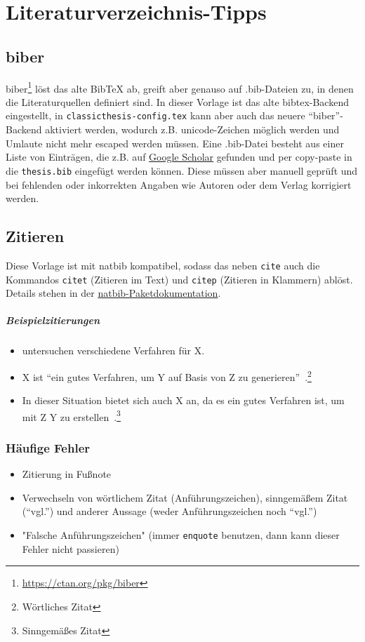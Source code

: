 \chapter{Literaturverzeichnis-Tipps}

\section{biber}
biber\footnote{\url{https://ctan.org/pkg/biber}} löst das alte BibTeX ab, greift aber genauso auf .bib-Dateien zu, in denen die Literaturquellen definiert sind. In dieser Vorlage ist das alte bibtex-Backend eingestellt, in \texttt{classicthesis-config.tex} kann aber auch das neuere \enquote{biber}-Backend aktiviert werden, wodurch z.B. unicode-Zeichen möglich werden und Umlaute nicht mehr escaped werden müssen.
Eine .bib-Datei besteht aus einer Liste von Einträgen, die z.B. auf \href{https://scholar.google.com}{Google Scholar} gefunden und per copy-paste in die \texttt{thesis.bib} eingefügt werden können.
Diese müssen aber manuell geprüft und bei fehlenden oder inkorrekten Angaben wie Autoren oder dem Verlag korrigiert werden.

\section{Zitieren}
Diese Vorlage ist mit natbib kompatibel, sodass das neben \texttt{cite} auch die Kommandos \texttt{citet} (Zitieren im Text) und \texttt{citep} (Zitieren in Klammern) ablöst.
Details stehen in der \href{http://mirrors.ctan.org/macros/latex/contrib/natbib/natbib.pdf}{natbib-Paketdokumentation}.

\paragraph{Beispielzitierungen}
\begin{itemize}
\item \citet{sniktec} untersuchen verschiedene Verfahren für X.
\item X ist \enquote{ein gutes Verfahren, um Y auf Basis von Z zu generieren}~\citep{sniktec}.\footnote{Wörtliches Zitat}
\item In dieser Situation bietet sich auch X an, da es ein gutes Verfahren ist, um mit Z Y zu erstellen~\citep[vgl.]{sniktec}.\footnote{Sinngemäßes Zitat}
\end{itemize}


\subsection{Häufige Fehler}
\begin{itemize}
\item Zitierung in Fußnote
\item Verwechseln von wörtlichem Zitat (Anführungszeichen), sinngemäßem Zitat (\enquote{vgl.}) und anderer Aussage (weder Anführungszeichen noch \enquote{vgl.})
\item "Falsche Anführungszeichen" (immer \texttt{enquote} benutzen, dann kann dieser Fehler nicht passieren)
\end{itemize}

